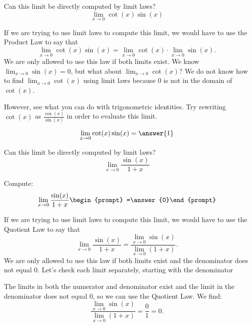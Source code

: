 \documentclass{ximera}
\begin{document}
\begin{question}
  Can this limit be directly computed by limit laws?
  \[
  \displaystyle\lim_{x\to 0} \cot(x)\sin(x)
  \]
  \begin{multipleChoice}
  \end{multipleChoice}
\begin{question}
  If we are trying to use limit laws to compute this limit, we would
  have to use the Product Law to say that
  \[
  \displaystyle\lim_{x\to 0} \cot(x)\sin(x) =\lim_{x\to 0} \cot(x) \cdot \lim_{x\to 0}\sin(x).
  \]
  We are only allowed to use this law if both limits exist.  We know
  $\displaystyle\lim_{x\to 0} \sin(x) = 0$, but what about $\displaystyle\lim_{x\to 0}\cot(x)$?  We do
  not know how to find $\lim_{x\to 0}\cot(x)$ using limit laws because $0$
  is not in the domain of $\cot(x)$.
  
  However, see what you can do with trigonometric identities. Try rewriting $\cot(x)$ as $\frac{\cos(x)}{\sin(x)}$ in order to evaluate this limit. 
  
\[
  \displaystyle\lim_{x\to 0} \cot(x)\sin(x) = \answer{1}
  \]
\end{question}
\end{question}


\begin{question}
  Can this limit be directly computed by limit laws?
  \[
  \displaystyle\lim_{x\to 0} \frac{\sin(x)}{1+x}
  \]
  \begin{multipleChoice}
  \end{multipleChoice}
  \begin{question}
    Compute:
    \[
    \displaystyle\lim_{x\to 0} \frac{\sin(x)}{1+x}\begin{prompt} =\answer{0}\end{prompt}
    \]
    \begin{feedback}
      If we are trying to use limit laws to compute this limit, we
      would have to use the Quotient Law to say that
      \[
      \displaystyle\lim_{x\to 0} \frac{\sin(x)}{1+x} = \displaystyle\frac{\lim_{x\to
          0}\sin(x)}{\lim_{x\to 0}(1+x)}.
      \]
      We are only allowed to use this law if both limits exist and the
      denominator does not equal $0$.  Let's check each limit
      separately, starting with the denominator
      
      The limits in both the numerator and denominator exist and the
      limit in the denominator does not equal $0$, so we can use the
      Quotient Law.  We find:
      \[
        \displaystyle \frac{\lim_{x\to 0}\sin(x)}{\lim_{x\to 0}(1+x)}=\frac{0}{1}=0.
        \]
    \end{feedback}
  \end{question}
\end{question}
\end{document}
